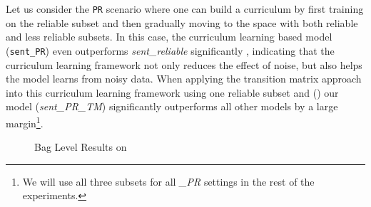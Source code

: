 Let us consider the \texttt{PR} scenario where one can build a curriculum by first training on the
reliable subset and then gradually moving to the space with both reliable and less
reliable subsets. In this case, the curriculum learning based model
(\texttt{sent\_PR}) even  outperforms \emph{sent\_reliable} significantly  ,
indicating that the curriculum learning framework not only reduces the effect
of noise, but also helps the model learns from noisy data. When applying the
transition matrix approach into this curriculum learning framework using one reliable
subset and 
()
our model (\emph{sent\_PR\_TM}) significantly outperforms all
other models by a large margin\footnote{We will use all three subsets for all
\emph{\_PR} settings in the rest of the experiments.}. 

\begin{figure}[t!]
\centering
{}
\caption{Bag Level Results on \TimeRE}
\label{fig: results_on_luo}
\end{figure}


